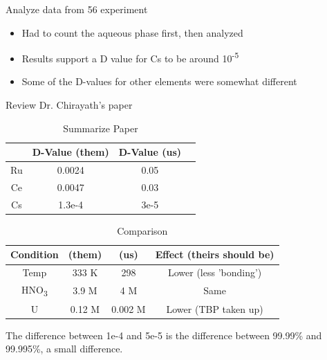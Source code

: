 \documentclass[idxtotoc,hyperref,openany,oneside]{labbook} %
\newcommand{\cmark}{\ding{51}}%
\newcommand{\done}{\rlap{$\square$}{\raisebox{2pt}{\large\hspace{1pt}\cmark}}%
  \hspace{-2.5pt}}
\newcommand{\tss}{\textsuperscript}
\newcommand{\tsbs}{\textsubscript}
\begin{document}


\begin{todolist}
\item[\done]{Analyze data from 56 experiment}
  \begin{itemize}
  \item{Had to count the aqueous phase first, then analyzed}
  \item{Results support a D value for Cs to be around 10\tss{-5}}
  \item{Some of the D-values for other elements were somewhat different}
  \end{itemize}
\item[\done]{Review Dr. Chirayath's paper}
  \begin{table}[H]
    \begin{center}
      \caption{Summarize Paper}
      \begin{tabular}{ |c|c|c|c| }
        \hline
         & D-Value (them) & D-Value (us) \\
        \hline
        Ru & 0.0024 & 0.05 \\
        Ce & 0.0047 & 0.03 \\
        Cs & 1.3e-4 & 3e-5 \\
        \hline
      \end{tabular}
    \end{center}
  \end{table}

    \begin{table}[H]
      \begin{center}
      \caption{Comparison}
      \begin{tabular}{ |c|c|c|c| }
        \hline
        Condition & (them) & (us) & Effect (theirs should be)\\
        \hline
        Temp & 333 K & 298 & Lower (less 'bonding')\\
        HNO\tsbs{3} & 3.9 M & 4 M & Same \\
        U & 0.12 M & 0.002 M & Lower (TBP taken up)\\
        \hline
      \end{tabular}
    \end{center}
  \end{table}

    The difference between 1e-4 and 5e-5 is the difference
    between 99.99\% and 99.995\%, a small difference.
  

\end{todolist}
\end{document}
